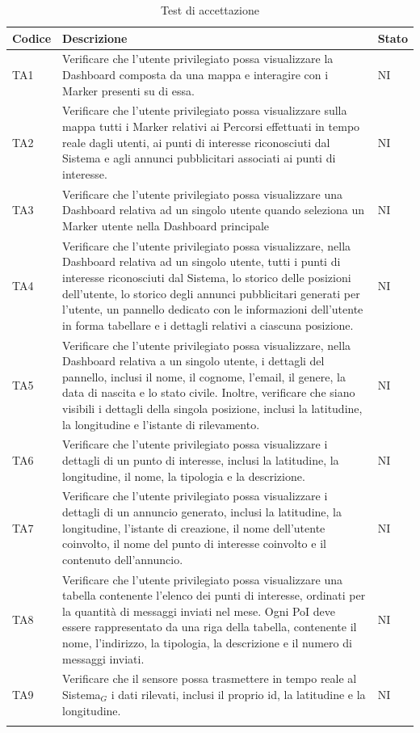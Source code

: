 \documentclass[10pt]{article}
\begin{document}
\begin{justify}
\begin{longtable}{|>{\centering\arraybackslash}m{2cm}|>{\centering\arraybackslash}m{7cm}|>{\centering\arraybackslash}m{2cm}|}
\hline
\textbf{Codice} & \textbf{Descrizione} & \textbf{Stato}\\
\endhead
\hline
TA1 & Verificare che l'utente privilegiato possa visualizzare la Dashboard composta da una mappa e interagire con i Marker presenti su di essa. & NI \\
\hline
TA2 & Verificare che l'utente privilegiato possa visualizzare sulla mappa tutti i Marker relativi ai Percorsi effettuati in tempo reale dagli utenti, ai punti di interesse riconosciuti dal Sistema e agli annunci pubblicitari associati ai punti di interesse. & NI \\
\hline
TA3 & Verificare che l'utente privilegiato possa visualizzare una Dashboard relativa ad un singolo utente quando seleziona un Marker utente nella Dashboard principale & NI \\
\hline
TA4 & Verificare che l'utente privilegiato possa visualizzare, nella Dashboard relativa ad un singolo utente, tutti i punti di interesse riconosciuti dal Sistema, lo storico delle posizioni dell'utente, lo storico degli annunci pubblicitari generati per l'utente, un pannello dedicato con le informazioni dell'utente in forma tabellare e i dettagli relativi a ciascuna posizione. & NI \\
\hline
TA5 & Verificare che l'utente privilegiato possa visualizzare, nella Dashboard relativa a un singolo utente, i dettagli del pannello, inclusi il nome, il cognome, l'email, il genere, la data di nascita e lo stato civile. Inoltre, verificare che siano visibili i dettagli della singola posizione, inclusi la latitudine, la longitudine e l'istante di rilevamento. & NI \\
\hline
TA6 & Verificare che l'utente privilegiato possa visualizzare i dettagli di un punto di interesse, inclusi la latitudine, la longitudine, il nome, la tipologia e la descrizione. & NI \\
\hline
TA7 & Verificare che l'utente privilegiato possa visualizzare i dettagli di un annuncio generato, inclusi la latitudine, la longitudine, l'istante di creazione, il nome dell'utente coinvolto, il nome del punto di interesse coinvolto e il contenuto dell'annuncio. & NI \\
\hline
TA8 & Verificare che l'utente privilegiato possa visualizzare una tabella contenente l'elenco dei punti di interesse, ordinati per la quantità di messaggi inviati nel mese. Ogni PoI deve essere rappresentato da una riga della tabella, contenente il nome, l'indirizzo, la tipologia, la descrizione e il numero di messaggi inviati. & NI \\
\hline
TA9 & Verificare che il sensore possa trasmettere in tempo reale al Sistema$_G$ i dati rilevati, inclusi il proprio id, la latitudine e la longitudine. & NI \\
\hline
\caption{Test di accettazione}\\
\end{longtable}



\end{justify}
\end{document}
